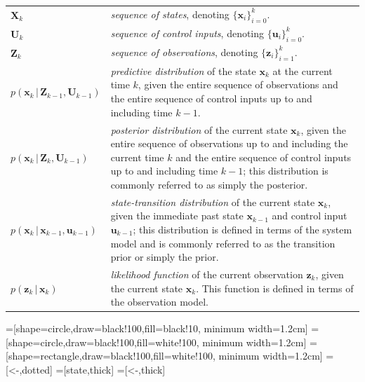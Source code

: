 \begin{table}[h]
\begin{tabularx}{\textwidth}{lX}
$\bm{X}_k$          		 & \emph{sequence of states}, denoting $\{\bm{x}_i\}^k_{i = 0}$. \\
$\bm{U}_k$          		 & \emph{sequence of control inputs}, denoting $\{\bm{u}_i\}^k_{i = 0}$. \\
$\bm{Z}_k$          		 & \emph{sequence of observations}, denoting $\{\bm{z}_i\}^k_{i = 1}$. \\
$p(\bm{x}_k\,|\,\bm{Z}_{k-1}, \bm{U}_{k-1})$ & \emph{predictive distribution} of the state $\bm{x}_k$ at the current time $k$, given the entire sequence of observations and the entire sequence of control inputs up to and including time $k-1$. \\
$p(\bm{x}_k\,|\,\bm{Z}_{k}, \bm{U}_{k-1})$ & \emph{posterior distribution} of the current state $\bm{x}_k$, given the entire sequence of observations up to and including the current time $k$ and the entire sequence of control inputs up to and including time $k-1$; this distribution is commonly referred to as simply the posterior. \\
$p(\bm{x}_k\,|\,\bm{x}_{k-1}, \bm{u}_{k-1})$ & \emph{state-transition distribution} of the current state $\bm{x}_k$, given the immediate past state $\bm{x}_{k-1}$ and control input $\bm{u}_{k-1}$; this distribution is defined in terms of the system model and is commonly referred to as the transition prior or simply the prior. \\
$p(\bm{z}_k\,|\,\bm{x}_{k})$ & \emph{likelihood function} of the current observation $\bm{z}_k$, given the current state $\bm{x}_{k}$. This function is defined in terms of the observation model.
\end{tabularx}
\end{table}

=[shape=circle,draw=black!100,fill=black!10, minimum width=1.2cm]
=[shape=circle,draw=black!100,fill=white!100,  minimum width=1.2cm]
=[shape=rectangle,draw=black!100,fill=white!100, minimum width=1.2cm]
=[<-,dotted]
=[state,thick]
=[<-,thick]



